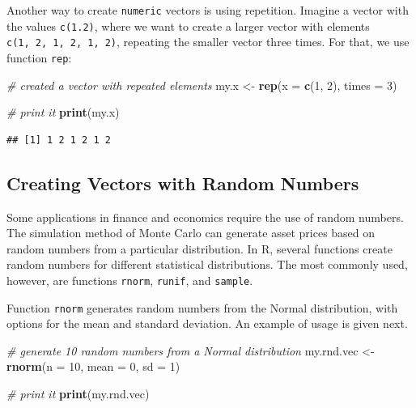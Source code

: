 \documentclass[11pt,]{book}
\newenvironment{Shaded}{\begin{snugshade}}{\end{snugshade}}
\newcommand{\KeywordTok}[1]{\textcolor[rgb]{0.27,0.27,0.27}{\textbf{#1}}}
\newcommand{\DataTypeTok}[1]{\textcolor[rgb]{0.27,0.27,0.27}{#1}}
\newcommand{\DecValTok}[1]{\textcolor[rgb]{0.06,0.06,0.06}{#1}}
\newcommand{\StringTok}[1]{\textcolor[rgb]{0.5,0.5,0.5}{#1}}
\newcommand{\CommentTok}[1]{\textcolor[rgb]{0.56,0.35,0.01}{\textit{#1}}}
\newcommand{\NormalTok}[1]{#1}
\begin{document}
Another way to create \texttt{numeric} vectors is using repetition.
Imagine a vector with the values \texttt{c(1.2)}, where we want to
create a larger vector with elements \texttt{c(1,\ 2,\ 1,\ 2,\ 1,\ 2)},
repeating the smaller vector three times. For that, we use function
\texttt{rep}: 

\begin{Shaded}
\begin{Highlighting}[]
\CommentTok{# created a vector with repeated elements}
\NormalTok{my.x <-}\StringTok{ }\KeywordTok{rep}\NormalTok{(}\DataTypeTok{x =} \KeywordTok{c}\NormalTok{(}\DecValTok{1}\NormalTok{, }\DecValTok{2}\NormalTok{), }\DataTypeTok{times =} \DecValTok{3}\NormalTok{)}

\CommentTok{# print it}
\KeywordTok{print}\NormalTok{(my.x)}
\end{Highlighting}
\end{Shaded}

\begin{verbatim}
## [1] 1 2 1 2 1 2
\end{verbatim}

\subsection{Creating Vectors with Random
Numbers}\label{creating-vectors-with-random-numbers}

Some applications in finance and economics require the use of random
numbers. The simulation method of Monte Carlo can generate asset prices
based on random numbers from a particular distribution. In R, several
functions create random numbers for different statistical distributions.
The most commonly used, however, are functions \texttt{rnorm},
\texttt{runif}, and \texttt{sample}. 
 

Function \texttt{rnorm} generates random numbers from the Normal
distribution, with options for the mean and standard deviation. An
example of usage is given next.

\begin{Shaded}
\begin{Highlighting}[]
\CommentTok{# generate 10 random numbers from a Normal distribution}
\NormalTok{my.rnd.vec <-}\StringTok{ }\KeywordTok{rnorm}\NormalTok{(}\DataTypeTok{n =} \DecValTok{10}\NormalTok{, }\DataTypeTok{mean =} \DecValTok{0}\NormalTok{, }\DataTypeTok{sd =} \DecValTok{1}\NormalTok{)}

\CommentTok{# print it}
\KeywordTok{print}\NormalTok{(my.rnd.vec)}
\end{Highlighting}
\end{Shaded}
\end{document}
